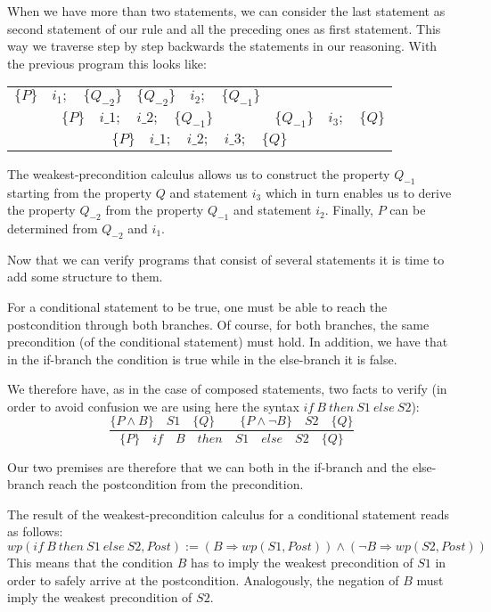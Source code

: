 

When we have more than two statements, we can consider the last
statement as second statement of our rule and all the preceding ones as
first statement. This way we traverse step by step backwards the
statements in our reasoning. With the previous program this looks like:


\begin{center}
\begin{tabular}{ccc}
  $\{P\}\quad i_1 ; \quad \{Q_{-2}\}$ & $\{Q_{-2}\}\quad i_2 ; \quad \{Q_{-1}\}$ & \\
  \cline{1-2}
  \multicolumn{2}{c}{$\{P\}\quad i\_1 ; \quad i\_2 ; \quad \{Q_{-1}\}$} & $\{Q_{-1}\} \quad i_3 ; \quad \{Q\}$\\
  \hline
  \multicolumn{3}{c}{$\{P\}\quad i\_1 ; \quad i\_2 ; \quad i\_3; \quad \{ Q \}$}
\end{tabular}
\end{center}

The weakest-precondition calculus allows us to construct the property
$Q_{-1}$ starting from the property $Q$ and statement $i_3$ which
in turn enables us to derive the property $Q_{-2}$ from the property
$Q_{-1}$ and statement $i_2$. Finally, $P$ can be determined from
$Q_{-2}$ and $i_1$.



Now that we can verify programs that consist of several statements it
is time to add some structure to them.





For a conditional statement to be true, one must be able to reach the
postcondition through both branches. Of course, for both branches, the
same precondition (of the conditional statement) must hold. In addition,
we have that in the if-branch the condition is true while in the
else-branch it is false.

We therefore have, as in the case of composed statements, two facts to
verify (in order to avoid confusion we are using here the syntax
$if\ B\ then\ S1\ else\ S2$):
$$\dfrac{\{P \wedge B\}\quad S1\quad \{Q\} \quad \quad \{P \wedge \neg B\}\quad S2\quad \{Q\}}{\{P\}\quad if\quad B\quad then\quad S1\quad else\quad S2 \quad \{Q\}}$$

Our two premises are therefore that we can both in the if-branch and the
else-branch reach the postcondition from the precondition.

The result of the weakest-precondition calculus for a conditional
statement reads as follows:
$$wp(if\ B\ then\ S1\ else\ S2 , Post) := (B \Rightarrow wp(S1, Post)) \wedge (\neg B \Rightarrow wp(S2, Post))$$
This means that the condition $B$ has to imply the weakest
precondition of $S1$ in order to safely arrive at the postcondition.
Analogously, the negation of $B$ must imply the weakest precondition
of $S2$.



